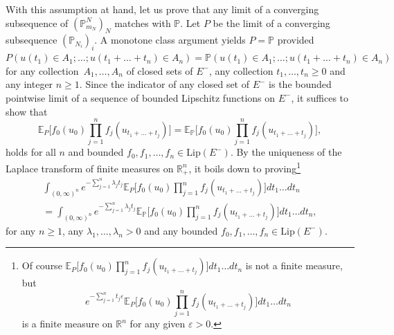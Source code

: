 \documentclass[AHL,Unicode,longabstracts]{cedram}
\theoremstyle{plain}
\newcommand{\bbE}{\mathbb{E}}
\newcommand{\bbP}{\mathbb{P}}
\newcommand{\bbR}{\mathbb{R}}
\newcommand{\R}{\mathbb{R}}
\newcommand*\Lip{\mathrm{Lip}}
\begin{document}
With this assumption at hand, let us prove that any limit of a converging subsequence of $(\bbP_{m_N}^{N})_N$ matches with $\bbP$. Let $P$ be the limit of a converging subsequence $(\bbP_{N_i})_i$. A monotone class argument yields $P=\bbP$ provided $P(u(t_1)\in A_1;\dots;u(t_1+\dots+t_n)\in A_n)=\bbP(u(t_1)\in A_1;\dots;u(t_1+\dots +t_n)\in A_n)$ for any collection~$A_1,\dots,A_n$ of closed sets of $E^-$, any collection $t_1,\dots,t_n \ge 0$ and any integer $n\ge 1$. Since the indicator of any closed set of $E^-$ is the bounded pointwise limit of a sequence of bounded Lipschitz functions on $E^-$, it suffices to show that
\begin{equation}
\bbE_P\Big[f_0(u_0)\prod_{j=1}^n f_j(u_{t_1+\dots+t_j})\Big] = \bbE_\bbP\Big[f_0(u_0)\prod_{j=1}^n f_j(u_{t_1+\dots+t_j})\Big],
\end{equation}
holds for all $n$ and bounded $f_0, f_1,\dots, f_n\in\Lip(E^-)$. By the uniqueness of the Laplace transform of finite measures on $\bbR^n_+$, it boils down to proving\footnote{ Of course $\bbE_P\Big[f_0(u_0)\prod_{j=1}^n f_j(u_{t_1+\dots+t_j})\Big] dt_1\dots dt_n$ is not a finite measure, but
\[
e^{-\sum_{j=1}^n t_j \varepsilon} \bbE_P\Big[f_0(u_0)\prod_{j=1}^n f_j(u_{t_1+\dots+t_j})\Big] dt_1\dots dt_n
\]
is a finite measure on $\R^n$ for any given $\varepsilon > 0$.}
\begin{multline}\label{Eq:IdResolvents}
\int_{(0,\infty)^n} e^{-\sum_{j=1}^n \lambda_j t_j} \bbE_P\Big[f_0(u_0)\prod_{j=1}^n f_j(u_{t_1+\dots+t_j})\Big] dt_1\dots dt_n\\
= \int_{(0,\infty)^n} e^{-\sum_{j=1}^n \lambda_j t_j} \bbE_\bbP\Big[f_0(u_0)\prod_{j=1}^n f_j(u_{t_1+\dots+t_j})\Big] dt_1\dots dt_n ,
\end{multline}
for any $n\geq 1$, any $\lambda_1,\dots,\lambda_n > 0$ and any bounded $f_0, f_1,\dots, f_n \in \Lip(E^{-})$.
\end{document}
